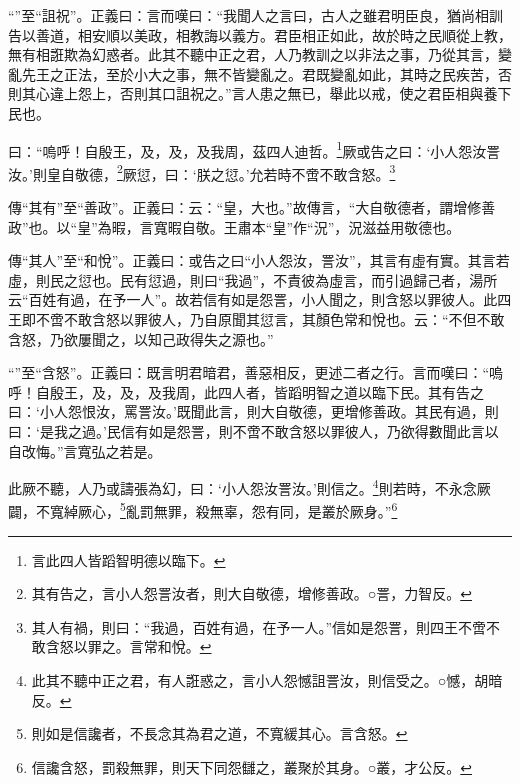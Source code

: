 {\noindent\shu{}\fzkt “”至“詛祝”。正義曰：言而嘆曰：“我聞人之言曰，古人之雖君明臣良，猶尚相訓告以善道，相安順以美政，相教誨以義方。君臣相正如此，故於時之民順從上教，無有相誑欺為幻惑者。此其不聽中正之君，人乃教訓之以非法之事，乃從其言，變亂先王之正法，至於小大之事，無不皆變亂之。君既變亂如此，其時之民疾苦，否則其心違上怨上，否則其口詛祝之。”言人患之無已，舉此以戒，使之君臣相與養下民也。 \par}

曰：“嗚呼！自殷王，及，及，及我周，茲四人迪哲。\footnote{言此四人皆蹈智明德以臨下。}厥或告之曰：‘小人怨汝詈汝。’則皇自敬德，\footnote{其有告之，言小人怨詈汝者，則大自敬德，增修善政。○詈，力智反。}厥愆，曰：‘朕之愆。’允若時不啻不敢含怒。\footnote{其人有禍，則曰：“我過，百姓有過，在予一人。”信如是怨詈，則四王不啻不敢含怒以罪之。言常和悅。}


{\noindent\zhuan{}\fzbyks 傳“其有”至“善政”。正義曰：云：“皇，大也。”故傳言，“大自敬德者，謂增修善政”也。以“皇”為暇，言寬暇自敬。王肅本“皇”作“況”，況滋益用敬德也。 \par}

{\noindent\zhuan{}\fzbyks 傳“其人”至“和悅”。正義曰：或告之曰“小人怨汝，詈汝”，其言有虛有實。其言若虛，則民之愆也。民有愆過，則曰“我過”，不責彼為虛言，而引過歸己者，湯所云“百姓有過，在予一人”。故若信有如是怨詈，小人聞之，則含怒以罪彼人。此四王即不啻不敢含怒以罪彼人，乃自原聞其愆言，其顏色常和悅也。云：“不但不敢含怒，乃欲屢聞之，以知己政得失之源也。” \par}

{\noindent\shu{}\fzkt “”至“含怒”。正義曰：既言明君暗君，善惡相反，更述二者之行。言而嘆曰：“嗚呼！自殷王，及，及，及我周，此四人者，皆蹈明智之道以臨下民。其有告之曰：‘小人怨恨汝，罵詈汝。’既聞此言，則大自敬德，更增修善政。其民有過，則曰：‘是我之過。’民信有如是怨詈，則不啻不敢含怒以罪彼人，乃欲得數聞此言以自改悔。”言寬弘之若是。 \par}

此厥不聽，人乃或譸張為幻，曰：‘小人怨汝詈汝。’則信之。\footnote{此其不聽中正之君，有人誑惑之，言小人怨憾詛詈汝，則信受之。○憾，胡暗反。}則若時，不永念厥闢，不寬綽厥心，\footnote{則如是信讒者，不長念其為君之道，不寬緩其心。言含怒。}亂罰無罪，殺無辜，怨有同，是叢於厥身。”\footnote{信讒含怒，罰殺無罪，則天下同怨讎之，叢聚於其身。○叢，才公反。}



